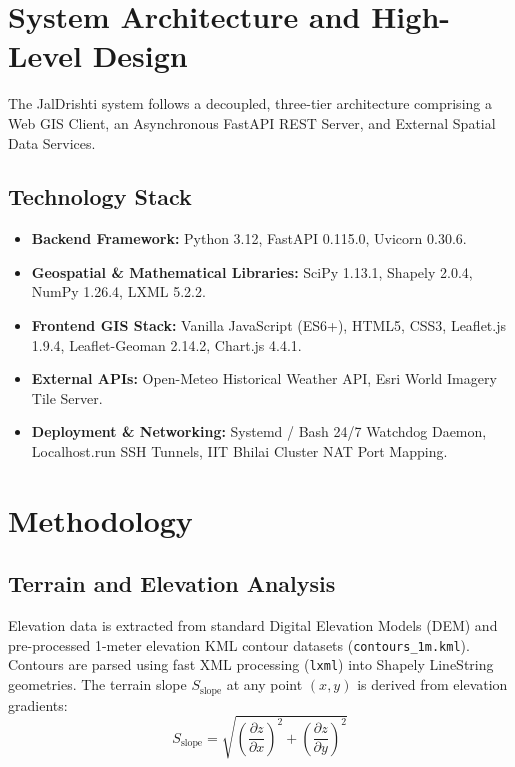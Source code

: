 \documentclass[11pt,a4paper]{article}
\begin{document}
\section{System Architecture and High-Level Design}
\label{sec:architecture}
The JalDrishti system follows a decoupled, three-tier architecture comprising a Web GIS Client, an Asynchronous FastAPI REST Server, and External Spatial Data Services.

\subsection{Technology Stack}
\begin{itemize}
    \item \textbf{Backend Framework:} Python 3.12, FastAPI 0.115.0, Uvicorn 0.30.6.
    \item \textbf{Geospatial \& Mathematical Libraries:} SciPy 1.13.1, Shapely 2.0.4, NumPy 1.26.4, LXML 5.2.2.
    \item \textbf{Frontend GIS Stack:} Vanilla JavaScript (ES6+), HTML5, CSS3, Leaflet.js 1.9.4, Leaflet-Geoman 2.14.2, Chart.js 4.4.1.
    \item \textbf{External APIs:} Open-Meteo Historical Weather API, Esri World Imagery Tile Server.
    \item \textbf{Deployment \& Networking:} Systemd / Bash 24/7 Watchdog Daemon, Localhost.run SSH Tunnels, IIT Bhilai Cluster NAT Port Mapping.
\end{itemize}

\section{Methodology}
\label{sec:methodology}

\subsection{Terrain and Elevation Analysis}
Elevation data is extracted from standard Digital Elevation Models (DEM) and pre-processed 1-meter elevation KML contour datasets (\texttt{contours\_1m.kml}). Contours are parsed using fast XML processing (\texttt{lxml}) into Shapely LineString geometries. The terrain slope $S_{\text{slope}}$ at any point $(x,y)$ is derived from elevation gradients:
\begin{equation}
S_{\text{slope}} = \sqrt{\left(\frac{\partial z}{\partial x}\right)^2 + \left(\frac{\partial z}{\partial y}\right)^2}
\end{equation}
\end{document}
